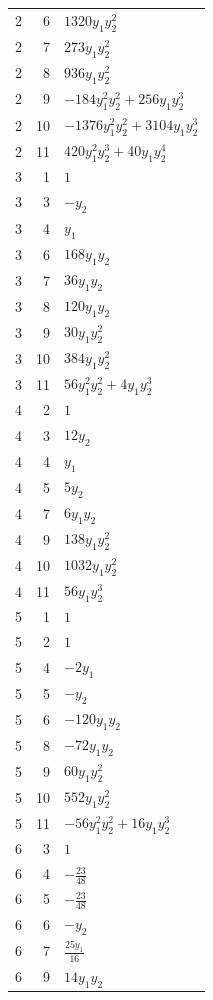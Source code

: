 \documentclass[10pt,a4paper]{article}
\begin{document}
{\begin{longtable}{rrp{125mm}}
2 & 6 & $1320 y_{1} y_{2}^{2}$\\
2 & 7 & $273 y_{1} y_{2}^{2}$\\
2 & 8 & $936 y_{1} y_{2}^{2}$\\
2 & 9 & $- 184 y_{1}^{2} y_{2}^{2} + 256 y_{1} y_{2}^{3}$\\
2 & 10 & $- 1376 y_{1}^{2} y_{2}^{2} + 3104 y_{1} y_{2}^{3}$\\
2 & 11 & $420 y_{1}^{2} y_{2}^{3} + 40 y_{1} y_{2}^{4}$\\
3 & 1 & $1$\\
3 & 3 & $- y_{2}$\\
3 & 4 & $y_{1}$\\
3 & 6 & $168 y_{1} y_{2}$\\
3 & 7 & $36 y_{1} y_{2}$\\
3 & 8 & $120 y_{1} y_{2}$\\
3 & 9 & $30 y_{1} y_{2}^{2}$\\
3 & 10 & $384 y_{1} y_{2}^{2}$\\
3 & 11 & $56 y_{1}^{2} y_{2}^{2} + 4 y_{1} y_{2}^{3}$\\
4 & 2 & $1$\\
4 & 3 & $12 y_{2}$\\
4 & 4 & $y_{1}$\\
4 & 5 & $5 y_{2}$\\
4 & 7 & $6 y_{1} y_{2}$\\
4 & 9 & $138 y_{1} y_{2}^{2}$\\
4 & 10 & $1032 y_{1} y_{2}^{2}$\\
4 & 11 & $56 y_{1} y_{2}^{3}$\\
5 & 1 & $1$\\
5 & 2 & $1$\\
5 & 4 & $- 2 y_{1}$\\
5 & 5 & $- y_{2}$\\
5 & 6 & $- 120 y_{1} y_{2}$\\
5 & 8 & $- 72 y_{1} y_{2}$\\
5 & 9 & $60 y_{1} y_{2}^{2}$\\
5 & 10 & $552 y_{1} y_{2}^{2}$\\
5 & 11 & $- 56 y_{1}^{2} y_{2}^{2} + 16 y_{1} y_{2}^{3}$\\
6 & 3 & $1$\\
6 & 4 & $- \frac{23}{48}$\\
6 & 5 & $- \frac{23}{48}$\\
6 & 6 & $- y_{2}$\\
6 & 7 & $\frac{25 y_{1}}{16}$\\
6 & 9 & $14 y_{1} y_{2}$\\

\end{longtable}}
\end{document}

